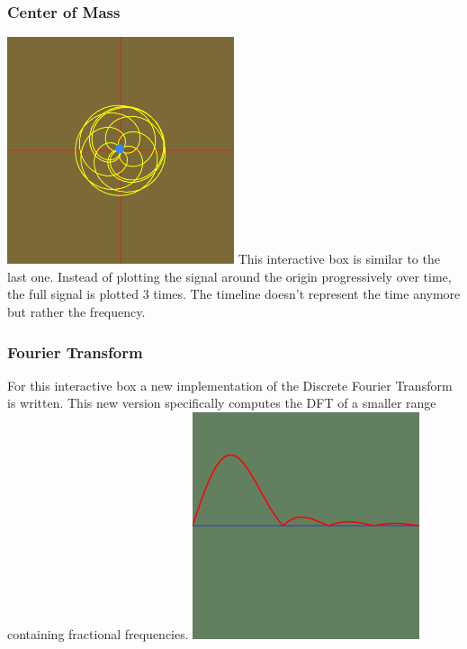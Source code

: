 \documentclass{article}
\begin{document}
\subsubsection{Center of Mass}

\begin{multicols}{2}
    \includegraphics[width=0.5\textwidth]{centerofmass.png}
    This interactive box is similar to the last one.
    Instead of plotting the signal around the origin progressively over time,
    the full signal is plotted 3 times. The timeline doesn't represent
    the time anymore but rather the frequency.
\end{multicols}

\pagebreak

\subsubsection{Fourier Transform}

\begin{multicols}{2}
    For this interactive box a new implementation of the Discrete Fourier Transform
    is written. This new version specifically computes the DFT of a smaller range containing fractional frequencies.
    \includegraphics[width=0.5\textwidth]{fouriertransformabs.png}
\end{multicols}
\end{document}
